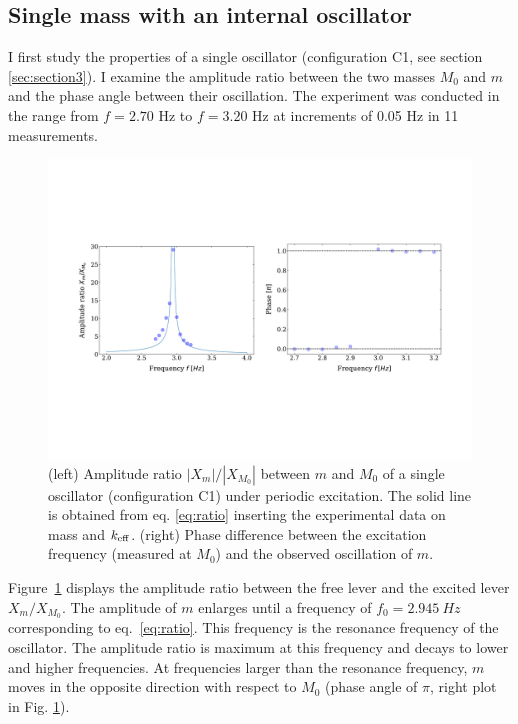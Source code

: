 \documentclass[12pt]{article}
\begin{document}
\subsection{Single mass with an internal oscillator}
I first study the properties of a single oscillator (configuration C1, see section \ref{sec:section3}). I examine the amplitude ratio between the two masses $M_0$ and $m$ and the phase angle between their oscillation. The experiment was conducted in the range from $f=2.70$ Hz to $f=3.20$ Hz at increments of 0.05 Hz in 11 measurements. 
\begin{figure}[hbt]
  \includegraphics[width=0.9\columnwidth]{results/condition3_amplitude_ratio}
  \caption{(left) Amplitude ratio $|X_m|/|X_{M_0}|$ between $m$ and $M_0$ of a single oscillator (configuration C1) under periodic excitation. The solid line is obtained from eq. \ref{eq:ratio} inserting the experimental data on mass and $k_{\rm eff}$. (right) Phase difference between the excitation frequency (measured at $M_{0}$) and the observed oscillation of $m$.} \label{fig:figure17}
\end{figure}
Figure~\ref{fig:figure17} displays the amplitude ratio between the free lever and the excited  lever $X_{m}/X_{M_{0}}$. The amplitude of $m$ enlarges until a frequency of $f_{0}=2.945 \:Hz$ corresponding to eq.~\ref{eq:ratio}. This frequency is the resonance frequency of the oscillator. The amplitude ratio is maximum at this frequency and decays to lower and higher frequencies. At frequencies larger than the resonance frequency, $m$  moves in the opposite direction with respect to $M_0$ (phase angle of $\pi$, right plot in Fig. \ref{fig:figure17}). 
\end{document}
